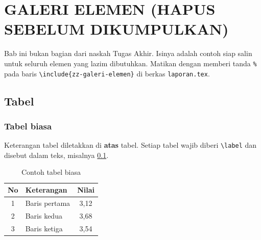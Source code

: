 %
%

\clearpage
\setcounter{chapter}{0}
\setcounter{figure}{0}
\setcounter{table}{0}
\setcounter{equation}{0}
\renewcommand{\thechapter}{G}
\renewcommand{\thesection}{G.\arabic{section}}
\renewcommand{\thesubsection}{\thesection.\arabic{subsection}}
\renewcommand{\thefigure}{G.\arabic{figure}}
\renewcommand{\thetable}{G.\arabic{table}}
\renewcommand{\theequation}{G.\arabic{equation}}

\chapter*{GALERI ELEMEN (HAPUS SEBELUM DIKUMPULKAN)}

Bab ini bukan bagian dari naskah Tugas Akhir. Isinya adalah contoh siap salin
untuk seluruh elemen yang lazim dibutuhkan. Matikan dengan memberi tanda
\texttt{\%} pada baris \texttt{\textbackslash include\{zz-galeri-elemen\}} di
berkas \texttt{laporan.tex}.

\section{Tabel}

\subsection{Tabel biasa}
Keterangan tabel diletakkan di \textbf{atas} tabel. Setiap tabel wajib diberi
\texttt{\textbackslash label} dan disebut dalam teks, misalnya
\cref{tab:g-biasa}.

\begin{table}[H]
    \centering
    \caption{Contoh tabel biasa}
    \label{tab:g-biasa}
    \begin{tabular}{|c|l|c|}
        \hline
        \textbf{No} & \textbf{Keterangan} & \textbf{Nilai} \\ \hline
        1 & Baris pertama & 3,12 \\ \hline
        2 & Baris kedua   & 3,68 \\ \hline
        3 & Baris ketiga  & 3,54 \\ \hline
    \end{tabular}
\end{table}


